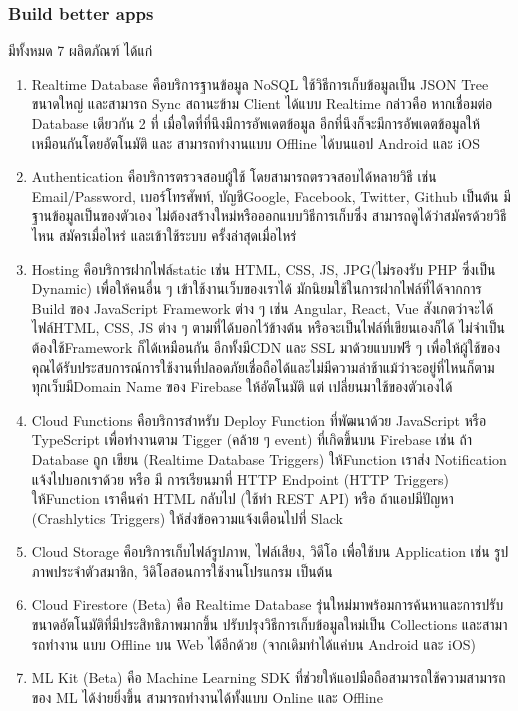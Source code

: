 \subsubsection{Build better apps}
มีทั้งหมด 7 ผลิตภัณฑ์ ได้แก่
\begin{enumerate}
  \item Realtime Database คือบริการฐานข้อมูล NoSQL ใช้วิธีการเก็บข้อมูลเป็น JSON Tree
  ขนาดใหญ่ และสามารถ Sync สถานะข้าม Client ได้แบบ Realtime กล่าวคือ หากเชื่อมต่อ Database
  เดียวกัน 2 ที่ เมื่อใดที่ที่นึงมีการอัพเดตข้อมูล อีกที่นึงก็จะมีการอัพเดตข้อมูลให้เหมือนกันโดยอัตโนมัติ และ
  สามารถทํางานแบบ Offline ได้บนแอป Android และ iOS
  
  \item Authentication คือบริการตรวจสอบผู้ใช้ โดยสามารถตรวจสอบได้หลายวิธี เช่น Email/Password, เบอร์โทรศัพท์, บัญชีGoogle, Facebook, Twitter, Github เป็นต้น มีฐานข้อมูลเป็นของตัวเอง
  ไม่ต้องสร้างใหม่หรือออกแบบวิธีการเก็บซึ่ง สามารถดูได้ว่าสมัครด้วยวิธีไหน สมัครเมื่อไหร่ และเข้าใช้ระบบ
  ครั้งล่าสุดเมื่อไหร่
  
  \item  Hosting คือบริการฝากไฟล์static เช่น HTML, CSS, JS, JPG(ไม่รองรับ PHP ซึ่งเป็น
  Dynamic) เพื่อให้คนอื่น ๆ เข้าใช้งานเว็บของเราได้ มักนิยมใช้ในการฝากไฟล์ที่ได้จากการ Build ของ
  JavaScript Framework ต่าง ๆ เช่น Angular, React, Vue สังเกตว่าจะได้ไฟล์HTML, CSS, JS
  ต่าง ๆ ตามที่ได้บอกไว้ข้างต้น หรือจะเป็นไฟล์ที่เขียนเองก็ได้ ไม่จําเป็นต้องใช้Framework ก็ได้เหมือนกัน
  อีกทั้งมีCDN และ SSL มาด้วยแบบฟรี ๆ เพื่อให้ผู้ใช้ของคุณได้รับประสบการณ์การใช้งานที่ปลอดภัยเชื่อถือได้และไม่มีความล่าช้าแม้ว่าจะอยู่ที่ไหนก็ตาม ทุกเว็บมีDomain Name ของ Firebase ให้อัตโนมัติ แต่
  เปลี่ยนมาใช้ของตัวเองได้

  \item Cloud Functions คือบริการสําหรับ Deploy Function ที่พัฒนาด้วย JavaScript หรือ
TypeScript เพื่อทํางานตาม Tigger (คล้าย ๆ event) ที่เกิดขึ้นบน Firebase เช่น ถ้า Database ถูก
เขียน (Realtime Database Triggers) ให้Function เราส่ง Notification แจ้งไปบอกเราด้วย หรือ มี
การเรียนมาที่ HTTP Endpoint (HTTP Triggers) ให้Function เราคืนค่า HTML กลับไป (ใช้ทํา
REST API) หรือ ถ้าแอปมีปัญหา (Crashlytics Triggers) ให้ส่งข้อความแจ้งเตือนไปที่ Slack

  \item Cloud Storage คือบริการเก็บไฟล์รูปภาพ, ไฟล์เสียง, วิดีโอ เพื่อใช้บน Application เช่น
  รูปภาพประจําตัวสมาชิก, วิดิโอสอนการใช้งานโปรแกรม เป็นต้น
  \item Cloud Firestore (Beta) คือ Realtime Database รุ่นใหม่มาพร้อมการค้นหาและการปรับ
  ขนาดอัตโนมัติที่มีประสิทธิภาพมากขึ้น ปรับปรุงวิธีการเก็บข้อมูลใหม่เป็น Collections และสามารถทํางาน
  แบบ Offline บน Web ได้อีกด้วย (จากเดิมทําได้แค่บน Android และ iOS)
  \item ML Kit (Beta) คือ Machine Learning SDK ที่ช่วยให้แอปมือถือสามารถใช้ความสามารถ
  ของ ML ได้ง่ายยิ่งขึ้น สามารถทํางานได้ทั้งแบบ Online และ Offline
\end{enumerate}

